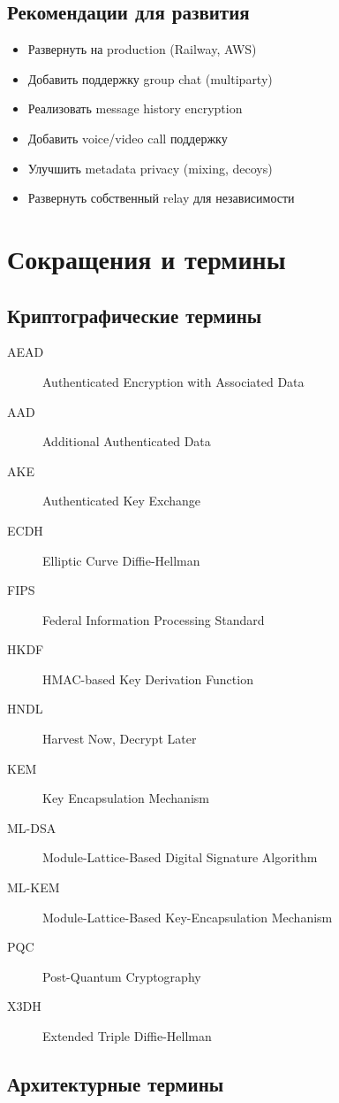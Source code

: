 \documentclass[11pt,a4paper,oneside]{book}
\begin{document}
\vspace{-0.3cm}\section{Рекомендации для развития}
\begin{itemize}
  \item Развернуть на production (Railway, AWS)
  \item Добавить поддержку group chat (multiparty)
  \item Реализовать message history encryption
  \item Добавить voice/video call поддержку
  \item Улучшить metadata privacy (mixing, decoys)
  \item Развернуть собственный relay для независимости
\end{itemize}
\appendix
\vspace{-0.5cm}\chapter{Сокращения и термины}
\vspace{-0.3cm}\section{Криптографические термины}
\begin{description}
  \item[AEAD] Authenticated Encryption with Associated Data
  \item[AAD] Additional Authenticated Data
  \item[AKE] Authenticated Key Exchange
  \item[ECDH] Elliptic Curve Diffie-Hellman
  \item[FIPS] Federal Information Processing Standard
  \item[HKDF] HMAC-based Key Derivation Function
  \item[HNDL] Harvest Now, Decrypt Later
  \item[KEM] Key Encapsulation Mechanism
  \item[ML-DSA] Module-Lattice-Based Digital Signature Algorithm
  \item[ML-KEM] Module-Lattice-Based Key-Encapsulation Mechanism
  \item[PQC] Post-Quantum Cryptography
  \item[X3DH] Extended Triple Diffie-Hellman
\end{description}
\vspace{-0.3cm}\section{Архитектурные термины}
\end{document}
